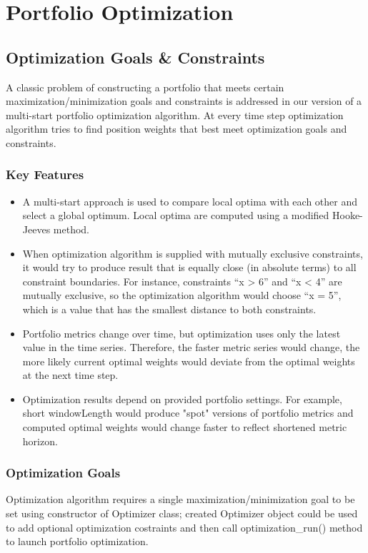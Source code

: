 \documentclass[letterpaper]{report}
\begin{document}
\chapter{Portfolio Optimization}

\section{Optimization Goals \& Constraints}
A classic problem of constructing a portfolio that meets certain maximization/minimization 
goals and constraints is addressed in our version of a multi-start portfolio optimization algorithm. At every time step
optimization algorithm tries to find position weights that best meet optimization goals and constraints.

\subsection{Key Features}
\begin{itemize} 
\item A multi-start approach is used to compare local optima with each other and select a global optimum. 
Local optima are computed using a modified Hooke-Jeeves  method.
\item When optimization algorithm is supplied with mutually exclusive constraints, it would try to produce result that is equally close (in absolute terms) to all constraint boundaries. 
For instance, constraints ``x > 6'' and ``x < 4'' are mutually exclusive, so
the optimization algorithm would choose ``x = 5'', which is a value that has the smallest distance to both constraints.
\item Portfolio metrics change over time, but optimization uses only the latest value in the time series.
Therefore, the faster metric series would change, the more likely current optimal weights would deviate
from the optimal weights at the next time step. 
\item Optimization results depend on provided portfolio settings. 
For example, short windowLength would produce "spot" versions of portfolio metrics and 
computed optimal weights would change faster to reflect shortened metric horizon. 
\end{itemize}

\subsection{Optimization Goals}
Optimization algorithm requires a single maximization/minimization goal to be set using 
constructor of Optimizer class; 
created Optimizer object could be used to add optional optimization costraints and then call 
optimization\_run()
method to launch portfolio optimization.
\end{document}
